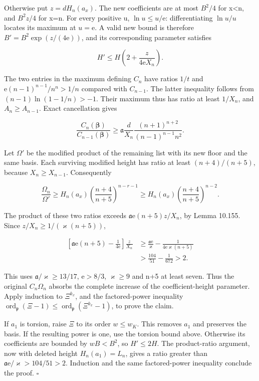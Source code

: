 \documentclass[
  11pt,
  a4paper,
]{article}
\begin{document}
Otherwise put \(z=dH_n(a_x)\). The new coefficients are at most
\(B^2/4\) for x\textless n, and \(B^2z/4\) for x=n. For every positive
u, \(\ln u\le u/\mathrm e\): differentiating \(\ln u/u\) locates its
maximum at \(u=\mathrm e\). A valid new bound is therefore
\(B'=B^2\exp(z/(4\mathrm e))\), and its corresponding parameter
satisfies

\[
H'\le H\left(2+\frac z{4\mathrm eX_n}\right).
\tag{10.485}
\]

The two entries in the maximum defining \(C_n\) have ratios \(1/t\) and
\(\mathrm e(n-1)^{n-1}/n^n>1/n\) compared with \(C_{n-1}\). The latter
inequality follows from \((n-1)\ln(1-1/n)>-1\). Their maximum thus has
ratio at least \(1/X_n\), and \(A_n\ge A_{n-1}\). Exact cancellation
gives

\[
\frac{C_n(\boldsymbol\beta)}{C_{n-1}(\boldsymbol\beta)}
\ge\mathfrak a\frac d{X_n}
\frac{(n+1)^{n+2}}{(n-1)^{n-1}n^2}.
\tag{10.486}
\]

Let \(\Omega'\) be the modified product of the remaining list with its
new floor and the same basis. Each surviving modified height has ratio
at least \((n+4)/(n+5)\), because \(X_n\ge X_{n-1}\). Consequently

\[
\frac{\Omega_n}{\Omega'}
\ge H_n(a_x)\left(\frac{n+4}{n+5}\right)^{n-r-1}
\ge H_n(a_x)\left(\frac{n+4}{n+5}\right)^{n-2}.
\tag{10.487}
\]

The product of these two ratios exceeds
\(\mathfrak a\mathrm e(n+5)z/X_n\), by Lemma 10.155. Since
\(z/X_n\ge1/(\varkappa(n+5))\),

\[
\begin{aligned}
\left[\mathfrak a\mathrm e(n+5)-\frac1{4\mathrm e}\right]\frac z{X_n}
&\ge\frac{\mathfrak a\mathrm e}{\varkappa}
       -\frac1{4\mathrm e\varkappa(n+5)}\\
&>\frac{104}{51}-\frac1{672}>2.
\end{aligned}
\tag{10.488}
\]

This uses \(\mathfrak a/\varkappa\ge13/17\), \(\mathrm e>8/3\),
\(\varkappa\ge9\) and n+5 at least seven. Thus the original
\(C_n\Omega_n\) absorbs the complete increase of the coefficient-height
parameter. Apply induction to \(\Xi^{k_x}\), and the factored-power
inequality \(\operatorname{ord}_{\mathfrak p}(\Xi-1)
\le\operatorname{ord}_{\mathfrak p}(\Xi^{k_x}-1)\), to prove the claim.

If \(a_1\) is torsion, raise \(\Xi\) to its order \(w\le w_K\). This
removes \(a_1\) and preserves the basis. If the resulting power is one,
use the torsion bound above. Otherwise its coefficients are bounded by
\(wB<B^2\), so \(H'\le2H\). The product-ratio argument, now with deleted
height \(H_n(a_1)=L_n\), gives a ratio greater than
\(\mathfrak a\mathrm e/\varkappa>104/51>2\). Induction and the same
factored-power inequality conclude the proof. \(\square\)
\end{document}
